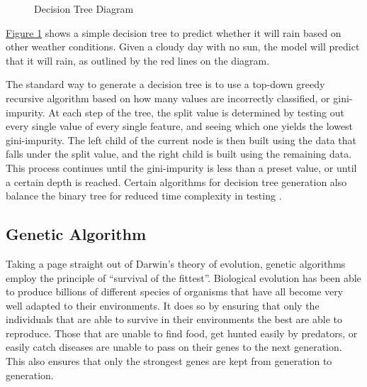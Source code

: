 \documentclass[12pt]{article}
\begin{document}
\begin{figure}[H]
    \centering
    \caption{Decision Tree Diagram}
    \label{fig:decisiontree}
\end{figure}

\hyperref[fig:decisiontree]{Figure 1} shows a simple decision tree to predict whether it will rain based on other weather conditions. Given a cloudy day with no sun, the model will predict that it will rain, as outlined by the red lines on the diagram.

The standard way to generate a decision tree is to use a top-down greedy recursive algorithm based on how many values are incorrectly classified, or gini-impurity. At each step of the tree, the split value is determined by testing out every single value of every single feature, and seeing which one yields the lowest gini-impurity. The left child of the current node is then built using the data that falls under the split value, and the right child is built using the remaining data. This process continues until the gini-impurity is less than a preset value, or until a certain depth is reached. Certain algorithms for decision tree generation also balance the binary tree for reduced time complexity in testing \cite{dt_skl_doc}.

\subsection{Genetic Algorithm}

Taking a page straight out of Darwin's theory of evolution, genetic algorithms employ the principle of ``survival of the fittest''. Biological evolution has been able to produce billions \cite{Sweetlove_2011} of different species of organisms that have all become very well adapted to their environments. It does so by ensuring that only the individuals that are able to survive in their environments the best are able to reproduce. Those that are unable to find food, get hunted easily by predators, or easily catch diseases are unable to pass on their genes to the next generation. This also ensures that only the strongest genes are kept from generation to generation.
\end{document}
